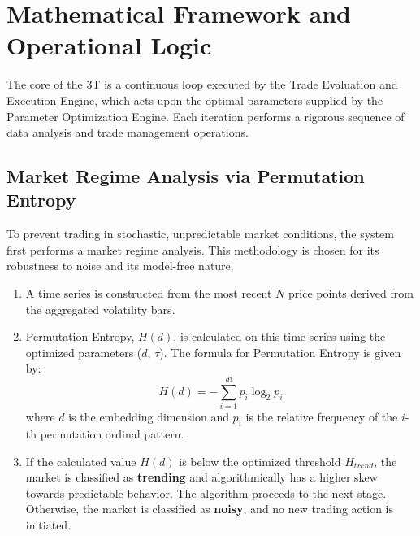\documentclass[11pt]{article}
\begin{document}
\section{Mathematical Framework and Operational Logic}
The core of the 3T is a continuous loop executed by the Trade Evaluation and Execution Engine, which acts upon the optimal parameters supplied by the Parameter Optimization Engine. Each iteration performs a rigorous sequence of data analysis and trade management operations.

\subsection{Market Regime Analysis via Permutation Entropy}
To prevent trading in stochastic, unpredictable market conditions, the system first performs a market regime analysis. This methodology is chosen for its robustness to noise and its model-free nature.\cite{PhysRevLett.88.174102}
\begin{enumerate}
    \item A time series is constructed from the most recent $N$ price points derived from the aggregated volatility bars.
    \item Permutation Entropy, $H(d)$, is calculated on this time series using the optimized parameters ($d$, $\tau$). The formula for Permutation Entropy is given by:
    $$ H(d) = -\sum_{i=1}^{d!} p_i \log_2 p_i $$
    where $d$ is the embedding dimension and $p_i$ is the relative frequency of the $i$-th permutation ordinal pattern.
    \item If the calculated value $H(d)$ is below the optimized threshold $H_{trend}$, the market is classified as \textbf{trending} and algorithmically has a higher skew towards predictable behavior. The algorithm proceeds to the next stage. Otherwise, the market is classified as \textbf{noisy}, and no new trading action is initiated.
\end{enumerate}
\end{document}
